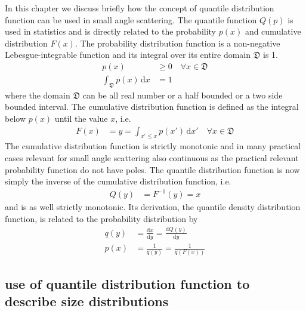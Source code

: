 In this chapter we discuss briefly how the concept of quantile distribution function can be used in small angle scattering. The quantile function $Q(p)$ is used in statistics and is directly related to the probability $p(x)$ and cumulative distribution $F(x)$. The probability distribution function is a non-negative Lebesgue-integrable function and its integral over its entire domain $\mathfrak{D}$ is 1.
\begin{align}\label{eq:pdf}
  p(x) & \geq 0 \quad \forall x \in \mathfrak{D} \\
  \int_{\mathfrak{D}} p(x) \, \mathrm{d}x &= 1
\end{align}
where the domain $\mathfrak{D}$ can be all real number or a half bounded or a two side bounded interval.
The cumulative distribution function is defined as the integral below $p(x)$ until the value $x$, i.e.
\begin{align}\label{eq:cdf}
  F(x) & = y =\int_{x'\leq x} p(x')\, \mathrm{d}x' \quad \forall x \in \mathfrak{D}
\end{align}
The cumulative distribution function is strictly monotonic and in many practical cases relevant for small angle scattering also continuous as the practical relevant probability function do not have poles. The quantile distribution function is now simply the inverse of the cumulative distribution function, i.e.
\begin{align}\label{eq:qdf}
  Q(y) &= F^{-1}(y) = x
\end{align}
and is as well strictly monotonic. Its derivation, the quantile density distribution function, is related to the probability distribution by
\begin{align}\label{eq:qddf}
  q(y) & = \frac{\mathrm{d}x}{\mathrm{d}y} = \frac{\mathrm{d}Q(y)}{\mathrm{d}y} \\
  p(x) &= \frac{1}{q(y)} = \frac{1}{q\left(F(x)\right)}
\end{align}

\subsection{use of quantile distribution function to describe size distributions} ~\\

